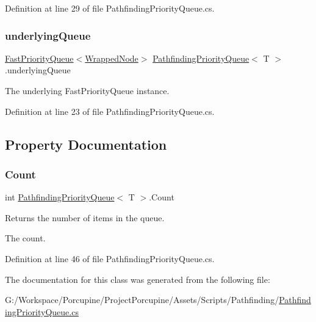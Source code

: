 Definition at line 29 of file Pathfinding\+Priority\+Queue.\+cs.

\mbox{\label{class_pathfinding_priority_queue_aa100a37883699f322596879886c5d2fd}} 
\subsubsection{\texorpdfstring{underlying\+Queue}{underlyingQueue}}
{\footnotesize\ttfamily \hyperlink{class_priority___queue_1_1_fast_priority_queue}{Fast\+Priority\+Queue}$<$\hyperlink{class_pathfinding_priority_queue_1_1_wrapped_node}{Wrapped\+Node}$>$ \hyperlink{class_pathfinding_priority_queue}{Pathfinding\+Priority\+Queue}$<$ T $>$.underlying\+Queue\hspace{0.3cm}{\ttfamily [protected]}}



The underlying Fast\+Priority\+Queue instance. 



Definition at line 23 of file Pathfinding\+Priority\+Queue.\+cs.



\subsection{Property Documentation}
\mbox{\label{class_pathfinding_priority_queue_ab19d993982443538e47a52e5740bc476}} 
\subsubsection{\texorpdfstring{Count}{Count}}
{\footnotesize\ttfamily int \hyperlink{class_pathfinding_priority_queue}{Pathfinding\+Priority\+Queue}$<$ T $>$.Count\hspace{0.3cm}{\ttfamily [get]}}



Returns the number of items in the queue. 

The count.

Definition at line 46 of file Pathfinding\+Priority\+Queue.\+cs.



The documentation for this class was generated from the following file\+:\begin{DoxyCompactItemize}
\item 
G\+:/\+Workspace/\+Porcupine/\+Project\+Porcupine/\+Assets/\+Scripts/\+Pathfinding/\hyperlink{_pathfinding_priority_queue_8cs}{Pathfinding\+Priority\+Queue.\+cs}\end{DoxyCompactItemize}
